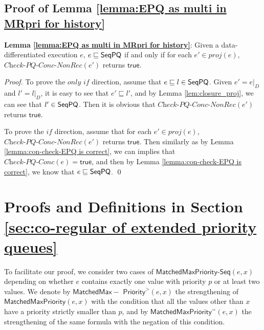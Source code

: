 \subsection{Proof of Lemma \ref{lemma:EPQ as multi in MRpri for history}}


{\noindent \bf Lemma \ref{lemma:EPQ as multi in MRpri for history}}: Given a data-differentiated execution $e$, $e \sqsubseteq \mathsf{SeqPQ}$ if and only if for each $e' \in \textit{proj}(e)$, $\textit{Check-PQ-Conc-NonRec}(e')$ returns $\mathsf{true}$.


\begin {proof}

To prove the $\textit{only if}$ direction, assume that $e \sqsubseteq l \in \mathsf{SeqPQ}$. Given $e' = e \vert_{D}$ and $l' = l \vert_{D}$, it is easy to see that $e' \sqsubseteq l'$, and by Lemma \ref{lem:closure_proj}, we can see that $l' \in \mathsf{SeqPQ}$. Then it is obvious that $\textit{Check-PQ-Conc-NonRec}(e')$ returns $\mathsf{true}$.

To prove the $\textit{if}$ direction, assume that for each $e' \in \textit{proj}(e)$, $\textit{Check-PQ-Conc-NonRec}(e')$ returns $\mathsf{true}$. Then similarly as by Lemma \ref{lemma:con-check-EPQ is correct}, we can implies that $\textit{Check-PQ-Conc}(e)=\mathsf{true}$, and then by Lemma \ref{lemma:con-check-EPQ is correct}, we know that $e \sqsubseteq \mathsf{SeqPQ}$. \qed
\end {proof}







\section{Proofs and Definitions in Section \ref{sec:co-regular of extended priority queues}}
\label{sec:appendix proof and definition in section co-regular of extended priority queues}

To facilitate our proof, we consider two cases of $\mathsf{MatchedMaxPriority\text{-}Seq}(e,x)$ depending on whether $e$ contains exactly one value with priority $p$ or at least two values. We denote by $\mathsf{MatchedMax-}$ $\mathsf{Priority}^{>}(e,x)$ the strengthening of $\mathsf{MatchedMaxPriority}(e,x)$ with the condition that all the values other than $x$ have a priority strictly smaller than $p$, and by $\mathsf{MatchedMaxPriority}^{=}(e,x)$ the strengthening of the same formula with the negation of this condition.

